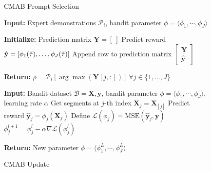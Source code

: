 \documentclass{article} %
\begin{document}
\begin{figure}[t]
    \begin{minipage}[t]{0.48\textwidth} %
\begin{algorithm}[H]
            \caption{CMAB Prompt Selection}\label{alg:select_prompt}
            \begin{algorithmic}[1]
                
                \item[] \textbf{Input:} Expert demonstrations $\mathcal{P}_i$, bandit parameter $\phi = \langle \phi_1, \cdots, \phi_J \rangle$
                \item[] \textbf{Initialize:} Prediction matrix $\mathbf{Y} = [\ ]$
                \STATE Predict reward $ \mathbf{\hat{y}} = [ \phi_1(\Tilde{\tau}), \dots, \phi_J(\Tilde{\tau}) ]$
                \STATE Append row to prediction matrix $\begin{bmatrix} \mathbf{Y} \\ \mathbf{\hat{y}} \end{bmatrix}$
                \ENDFOR
                \item[] \textbf{Return:} $\rho = \mathcal{P}_i[\arg \max(\mathbf{Y}[j, :])]\ \forall j \in \{1, ..., J\}$
            \end{algorithmic}
        \end{algorithm}
    \end{minipage}%
    \hfill
    \begin{minipage}[t]{0.48\textwidth} %
        \begin{algorithm}[H]
            \caption{CMAB Update}\label{alg:update_bandit}
            \begin{algorithmic}[1]
            \item[] \textbf{Input:} Bandit dataset $\mathcal{B} = \mathbf{X}, \mathbf{y}$, bandit parameter $\phi = \langle \phi_1, \cdots, \phi_J \rangle$, learning rate $\alpha$
                    \STATE Get segments at $j$-th index $\mathbf{X}_j = \mathbf{X}_{[j]}$
                    \STATE Predict reward $\mathbf{\hat{y}}_j = \phi_j(\mathbf{X}_j)$
                    \STATE Define $\mathcal{L}(\phi_j) = \text{MSE}(\mathbf{\hat{y}}_j, \mathbf{y})$
                    \STATE $\phi_j^{l+1} = \phi_j^l - \alpha \nabla \mathcal{L}(\phi_j^l)$
                    \ENDFOR                        
                \ENDFOR
            \item[] \textbf{Return:} New parameter $\phi = \langle \phi_1^L, \cdots, \phi_J^L \rangle$
        \end{algorithmic}
        \end{algorithm}
    \end{minipage}
\end{figure}
\end{document}
